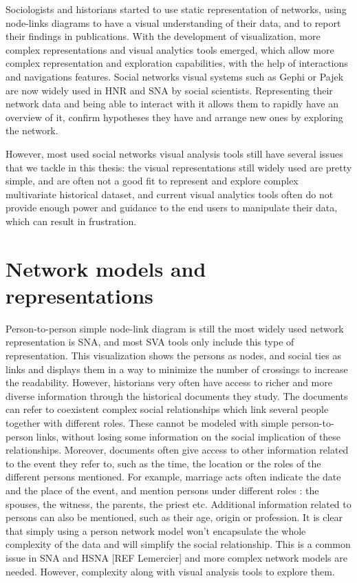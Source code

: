 Sociologists and historians started to use static representation of networks, using node-links diagrams to have a visual understanding of their data, and to report their findings in publications. With the development of visualization, more complex representations and visual analytics tools emerged, which allow more complex representation and exploration capabilities, with the help of interactions and navigations features. Social networks visual systems such as Gephi or Pajek are now widely used in HNR and SNA by social scientists. Representing their network data and being able to interact with it allows them to rapidly have an overview of it, confirm hypotheses they have and arrange new ones by exploring the network.

However, most used social networks visual analysis tools still have several issues that we tackle in this thesis: the visual representations still widely used are pretty simple, and are often not a good fit to represent and explore complex multivariate historical dataset, and current visual analytics tools often do not provide enough power and guidance to the end users to manipulate their data, which can result in frustration.

\section{Network models and representations}

Person-to-person simple node-link diagram is still the most widely used network representation is SNA, and most SVA tools only include this type of representation.
This visualization shows the persons as nodes, and social ties as links and displays them in a way to minimize the number of crossings to increase the readability.
However, historians very often have access to richer and more diverse information through the historical documents they study.
The documents can refer to coexistent complex social relationships which link several people together with different roles.
These cannot be modeled with simple person-to-person links, without losing some information on the social implication of these relationships.
Moreover, documents often give access to other information related to the event they refer to, such as the time, the location or the roles of the different persons mentioned.
For example, marriage acts often indicate the date and the place of the event, and mention persons under different roles : the spouses, the witness, the parents, the priest etc.
Additional information related to persons can also be mentioned, such as their age, origin or profession.
It is clear that simply using a person network model won’t encapsulate the whole complexity of the data and will simplify the social relationship. This is a common issue in SNA and HSNA [REF Lemercier] and more complex network models are needed. However, complexity
along with visual analysis tools to explore them.

